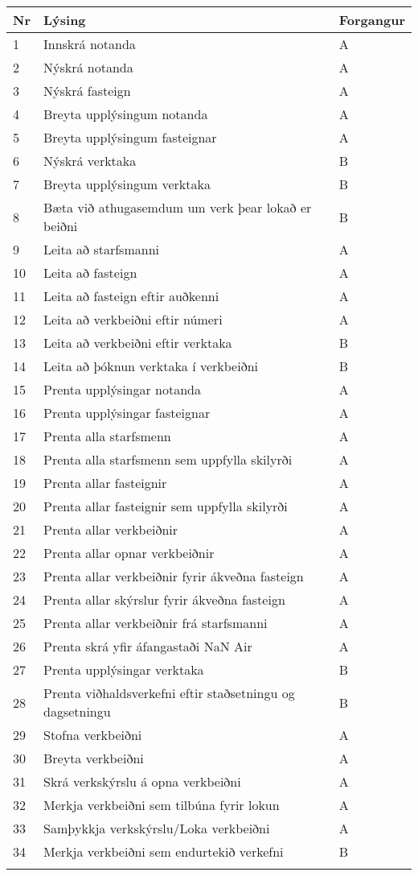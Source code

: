 \documentclass[a4paper]{article}
\begin{document}
\begin{tabular}{|l|l|l|}
\hline
Nr& Lýsing& Forgangur\\
\hline
1& Innskrá notanda & A \\
\hline
2& Nýskrá notanda & A \\
\hline
3& Nýskrá fasteign & A \\
\hline
4& Breyta upplýsingum notanda & A \\
\hline
5& Breyta upplýsingum fasteignar & A \\
\hline
6& Nýskrá verktaka & B \\
\hline
7& Breyta upplýsingum verktaka & B \\
\hline
8& Bæta við athugasemdum um verk þear lokað er beiðni & B \\
\hline
9& Leita að starfsmanni & A \\
\hline
10& Leita að fasteign & A \\
\hline
11& Leita að fasteign eftir auðkenni & A\\
\hline
12& Leita að verkbeiðni eftir númeri & A \\
\hline
13& Leita að verkbeiðni eftir verktaka & B \\
\hline
14& Leita að þóknun verktaka í verkbeiðni & B \\
\hline
15& Prenta upplýsingar notanda & A \\
\hline
16& Prenta upplýsingar fasteignar & A \\
\hline
17& Prenta alla starfsmenn & A \\
\hline
18& Prenta alla starfsmenn sem uppfylla skilyrði & A \\
\hline
19& Prenta allar fasteignir & A \\
\hline
20& Prenta allar fasteignir sem uppfylla skilyrði & A     \\
\hline
21& Prenta allar verkbeiðnir & A \\
\hline
22& Prenta allar opnar verkbeiðnir & A \\
\hline
23& Prenta allar verkbeiðnir fyrir ákveðna fasteign & A \\
\hline
24& Prenta allar skýrslur fyrir ákveðna fasteign & A \\
\hline
25& Prenta allar verkbeiðnir frá starfsmanni & A \\
\hline
26& Prenta skrá yfir áfangastaði NaN Air & A \\
\hline
27& Prenta upplýsingar verktaka & B \\
\hline
28& Prenta viðhaldsverkefni eftir staðsetningu og dagsetningu & B \\
\hline
29& Stofna verkbeiðni & A \\
\hline
30& Breyta verkbeiðni & A \\
\hline
31& Skrá verkskýrslu á opna verkbeiðni & A \\
\hline
32& Merkja verkbeiðni sem tilbúna fyrir lokun & A \\
\hline
33& Samþykkja verkskýrslu/Loka verkbeiðni & A \\
\hline
34& Merkja verkbeiðni sem endurtekið verkefni & B \\
\hline
&&\\
\hline
\end{tabular}
\end{document}
